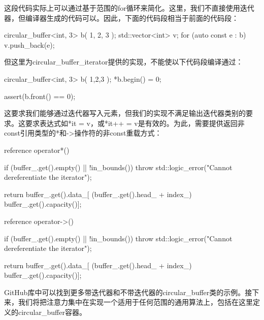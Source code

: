 这段代码实际上可以通过基于范围的for循环来简化。这里，我们不直接使用迭代器，但编译器生成的代码可以。因此，下面的代码段相当于前面的代码段：

\begin{cpp}
circular_buffer<int, 3> b({ 1, 2, 3 });
std::vector<int> v;
for (auto const e : b)
{
	v.push_back(e);
}
\end{cpp}

但这里为circular\_buffer\_iterator提供的实现，不能使以下代码段编译通过：

\begin{cpp}
circular_buffer<int, 3> b({ 1,2,3 });
*b.begin() = 0;

assert(b.front() == 0);
\end{cpp}

这要求我们能够通过迭代器写入元素，但我们的实现不满足输出迭代器类别的要求。这要求表达式如*it = v，或*it++ = v是有效的。为此，需要提供返回非const引用类型的*和->操作符的非const重载方式：

\begin{cpp}
reference operator*()
{
	if (buffer_.get().empty() || !in_bounds())
		throw std::logic_error("Cannot dereferentiate the
								iterator");
	
	return buffer_.get().data_[
		(buffer_.get().head_ + index_) %
		 buffer_.get().capacity()];
}

reference operator->()
{
	if (buffer_.get().empty() || !in_bounds())
		throw std::logic_error("Cannot dereferentiate the
								iterator");
								
	return buffer_.get().data_[
		(buffer_.get().head_ + index_) %
		 buffer_.get().capacity()];
}
\end{cpp}

GitHub库中可以找到更多带迭代器和不带迭代器的circular\_buffer类的示例。接下来，我们将把注意力集中在实现一个适用于任何范围的通用算法上，包括在这里定义的circular\_buffer容器。






















